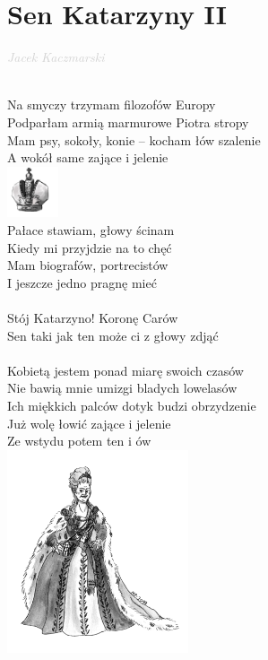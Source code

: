 \documentclass[a5paper, 10pt]{book}
\begin{document}
\newpage
\section{Sen Katarzyny II}\textcolor{lightgray}{\textit{Jacek Kaczmarski}}\\~\\
\begin{minipage}[t]{0.85\textwidth}
Na smyczy trzymam filozofów Europy\\
Podparłam armią marmurowe Piotra stropy\\
Mam psy, sokoły, konie – kocham łów szalenie\\
A wokół same zające i jelenie\\
\hspace*{6cm}\includegraphics[height=1.5cm]{images/sen_katarzyny_1.png}\vspace*{-1.6cm}\\
Pałace stawiam, głowy ścinam\\
Kiedy mi przyjdzie na to chęć\\
Mam biografów, portrecistów\\
I jeszcze jedno pragnę mieć\\
\\
\hspace*{5mm}Stój Katarzyno! Koronę Carów\\
\hspace*{5mm}Sen taki jak ten może ci z głowy zdjąć\\
\\
Kobietą jestem ponad miarę swoich czasów\\
Nie bawią mnie umizgi bladych lowelasów\\
Ich miękkich palców dotyk budzi obrzydzenie\\
Już wolę łowić zające i jelenie\\
Ze wstydu potem ten i ów\\
\hspace*{6cm}\includegraphics[height=6cm]{images/sen_katarzyny_2.png}\vspace*{-6.1cm}\\

\end{minipage}
\end{document}
